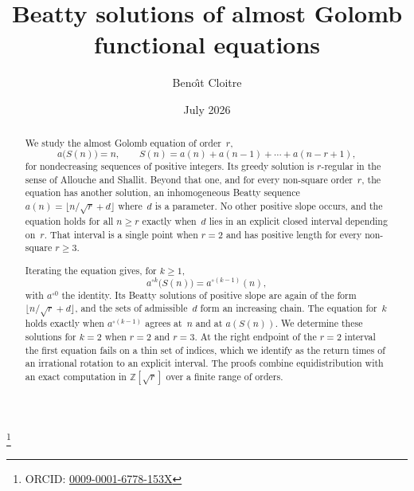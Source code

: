 \documentclass{birkjour}
\theoremstyle{definition}
\theoremstyle{remark}
\newcommand{\fl}[1]{\lfloor #1 \rfloor}
\begin{document}
\title[Beatty solutions of almost Golomb equations]
      {Beatty solutions of almost Golomb\br
       functional equations}

\author[B. Cloitre]{Beno\^{\i}t Cloitre}


\thanks{ORCID:
\href{https://orcid.org/0009-0001-6778-153X}{0009-0001-6778-153X}}



\date{July 2026}

\begin{abstract}
\noindent
We study the almost Golomb equation of order~$r$,
\begin{equation*}
  a\bigl(S(n)\bigr)=n,\qquad
  S(n)=a(n)+a(n{-}1)+\cdots+a(n{-}r{+}1),
\end{equation*}
for nondecreasing sequences of positive integers. Its greedy
solution is $r$-regular in the sense of Allouche and Shallit.
Beyond that one, and for every non-square order~$r$, the
equation has another solution, an inhomogeneous
Beatty sequence $a(n)=\fl{n/\!\sqrt{r}+d}$ where~$d$ is a
parameter. No other positive slope occurs, and the equation
holds for all $n\ge r$ exactly when~$d$ lies in an explicit
closed interval depending on~$r$. That interval is a single
point when $r=2$ and has positive length for every non-square
$r\ge 3$.

Iterating the equation gives, for $k\ge 1$,
\begin{equation*}
  a^{\circ k}\bigl(S(n)\bigr)=a^{\circ(k-1)}(n),
\end{equation*}
with $a^{\circ 0}$ the identity. Its Beatty solutions of
positive slope are again of the form $\fl{n/\!\sqrt{r}+d}$,
and the sets of admissible~$d$ form an increasing chain.
The equation for~$k$ holds exactly when $a^{\circ(k-1)}$
agrees at~$n$ and at $a(S(n))$. We determine these solutions
for $k=2$ when $r=2$ and $r=3$. At the right endpoint of the
$r=2$ interval the first equation fails on a thin set of
indices, which we identify as the return times of an
irrational rotation to an explicit interval. The proofs
combine equidistribution with an exact computation in
$\mathbb{Z}[\sqrt{r}]$ over a finite range of orders.
\end{abstract}
\end{document}

